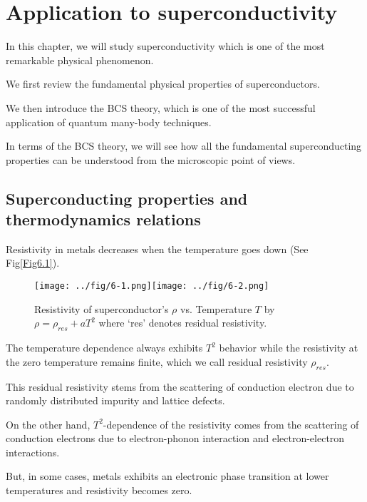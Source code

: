 

\chapter{Application to superconductivity}


In this chapter, we will study superconductivity which is one of the most remarkable physical phenomenon.

We first review the fundamental physical properties of superconductors.

We then introduce the BCS theory, which is one of the most successful application of quantum many-body techniques.

In terms of the BCS theory, we will see how all the fundamental superconducting properties can be understood from the microscopic point of views.



\section{Superconducting properties and thermodynamics relations}


Resistivity in metals decreases when the temperature goes down (See Fig{\ref{Fig6.1}}).

\begin{figure}
\begin{center}
\texttt{[image: ../fig/6-1.png]}\label{Fig6.1}\texttt{[image: ../fig/6-2.png]}\label{Fig6.2}
\caption{Resistivity $\rho$ vs. Temperature $T$ by $\rho = \rho_{res} + aT^2$ where `res' denotes residual resistivity. } \caption{Resistivity of superconductor's $\rho$ vs. Temperature $T$ by $\rho = \rho_{res} + aT^2$ where `res' denotes residual resistivity. } 
\end{center}
\end{figure}
The temperature dependence always exhibits $T^2$ behavior while the resistivity at the zero temperature remains finite, which we call residual resistivity $\rho_{res}$.
    
This residual resistivity stems from the scattering of conduction electron due to randomly distributed impurity and lattice defects. 
    
On the other hand, $T^2$-dependence of the resistivity comes from the scattering of conduction electrons due to electron-phonon interaction and electron-electron interactions. 
    
But, in some cases, metals exhibits an electronic phase transition at lower temperatures and resistivity becomes zero. 


